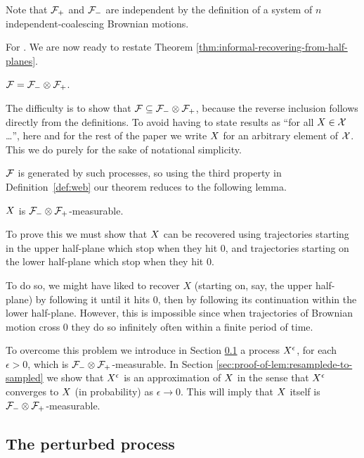 {  Note that $\mathcal{F}_{+}$ and $\mathcal{F}_{-}$ are independent by the definition of
  a system of $n$ independent-coalescing Brownian motions.

  \newcommand{\F}{\mathcal{F}}
  For \tensorcondition{}.
  We are now ready to restate Theorem
  \ref{thm:informal-recovering-from-half-planes}.

\begin{theorem}\label{thm:recoveringfromhalfplanes}
  $\mathcal{F} = \mathcal{F}_{-} \otimes \mathcal{F}_{+}$.
\end{theorem}

The difficulty is to show that $\mathcal{F} \subseteq \mathcal{F}_{-} \otimes \mathcal{F}_{+}$,
because the reverse inclusion follows directly from the definitions.
To avoid having to state results as ``for all $X \in \mathcal{X}$
\ldots'', here and for the rest of the paper we write $X$ for
an arbitrary element of $\mathcal{X}$.  This we do purely for the sake of
notational simplicity.

$\mathcal{F}$ is generated by such processes, so
using the third property in Definition~\ref{def:web}
our theorem reduces to the following lemma.

\begin{lemma}
  \label{lem:sampled-twostrip-meas}
  $X$ is $\mathcal{F}_{-} \otimes \mathcal{F}_{+}$-measurable.
\end{lemma}

To prove this we must show that $X$ can be recovered using
trajectories starting in the upper half-plane which stop when they hit
$0$, and trajectories starting on the lower half-plane which stop when
they hit $0$.

To do so, we might have liked to recover $X$ (starting on, say, the
upper half-plane) by following it until it hits 0, then by following its
continuation within the lower half-plane.  However, this is impossible
since when trajectories of Brownian motion cross $0$ they do so
infinitely often within a finite period of time.

To overcome this problem we introduce in Section
\ref{subsec:the-perturbed-process} a process $X^{\epsilon}$, for each
$\epsilon > 0$, which is $\mathcal{F}_{-} \otimes \mathcal{F}_{+}$-measurable.  In Section
\ref{sec:proof-of-lem:resamplede-to-sampled} we show that
$X^{\epsilon}$ is an approximation of $X$ in the sense that
$X^{\epsilon}$ converges to $X$ (in probability) as $\epsilon \to 0$.  This will
imply that $X$ itself is $\mathcal{F}_{-} \otimes \mathcal{F}_{+}$-measurable.

\subsection{The perturbed process}
\label{subsec:the-perturbed-process}

}
